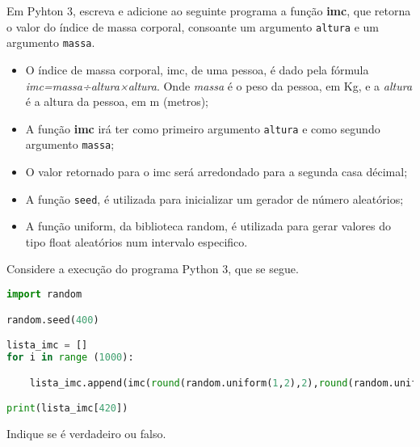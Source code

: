 \documentclass[12pt,varwidth=16cm,border=17pt]{standalone}
\begin{document}
Em Pyhton 3, escreva e adicione ao seguinte programa a função \textbf{imc}, que retorna o valor do índice de massa corporal, consoante um argumento \verb+altura+ e um argumento \verb+massa+.
\begin{itemize}

  \item  O índice de massa corporal, imc, de uma pessoa, é dado pela fórmula \emph{imc=massa÷altura×altura}. Onde \emph{massa} é o peso da pessoa, em Kg, e a \emph{altura} é a altura da pessoa, em m (metros);
  \item A função \textbf{imc} irá ter como primeiro argumento \verb+altura+ e como segundo argumento \verb+massa+;
  \item O valor retornado para o imc será arredondado para a segunda casa décimal;
  \item A função \verb+seed+, é utilizada para inicializar um gerador de número aleatórios;
  \item A função uniform, da biblioteca random, é utilizada para gerar valores do tipo float aleatórios num intervalo especifico.
  
  

    
\end{itemize}




Considere a execução do programa Python 3, que se segue. 

\begin{lstlisting}[language=Python]
import random

random.seed(400)

lista_imc = []
for i in range (1000):

    lista_imc.append(imc(round(random.uniform(1,2),2),round(random.uniform(40,80),2)))

print(lista_imc[420])
\end{lstlisting}

Indique se é verdadeiro ou falso.
\end{document}
